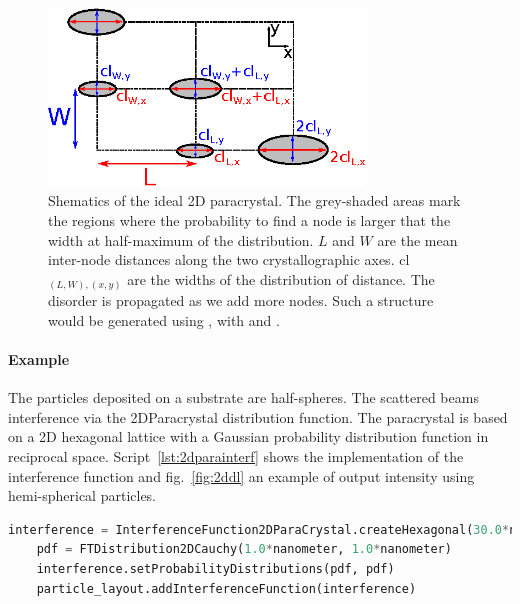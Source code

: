 \begin{figure}[ht]
\begin{center}
\includegraphics[width=0.75\textwidth]{Figures/drawing/drawing2Dparacrystal.eps}
\end{center}
\caption{Shematics of the ideal 2D paracrystal. The grey-shaded areas mark the regions where the probability to find a node is larger that the width at half-maximum of the distribution. $L$ and  $W$ are the mean inter-node distances along the two crystallographic axes. cl$_{(L,W),(x,y)}$ are the widths of the distribution of distance. The disorder is propagated as we add more nodes. Such a structure would be generated using , with  and  .}
\label{fig:2dparaschematic}
\end{figure}


\paragraph{Example} The particles deposited on a substrate are half-spheres. The scattered beams interference via the 2DParacrystal distribution function. The paracrystal is based on a 2D hexagonal lattice with a Gaussian probability distribution function in reciprocal space.  Script~\ref{lst:2dparainterf} shows the implementation of the interference function and fig.~\ref{fig:2ddl} an example of output intensity using hemi-spherical particles.

\begin{lstlisting}[language=python, style=eclipseboxed,numbers=none,nolol,caption={\Code{Python} script to define a "2DParacrystal" interference function between particles forming an hexagonal monolayer. },label={lst:2dparainterf}]
    interference = InterferenceFunction2DParaCrystal.createHexagonal(30.0*nanometer,0.0, 40.0*micrometer, 40.0*micrometer)|
    pdf = FTDistribution2DCauchy(1.0*nanometer, 1.0*nanometer)
    interference.setProbabilityDistributions(pdf, pdf)
    particle_layout.addInterferenceFunction(interference)
\end{lstlisting}


